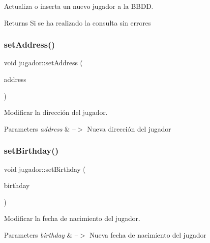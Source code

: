 Actualiza o inserta un nuevo jugador a la B\+B\+DD. 

\begin{DoxyReturn}{Returns}
Si se ha realizado la consulta sin errores 
\end{DoxyReturn}
\mbox{\label{classjugador_a1e4da4c657e46c0368f1db72ce102d93}} 
\subsubsection{\texorpdfstring{set\+Address()}{setAddress()}}
{\footnotesize\ttfamily void jugador\+::set\+Address (\begin{DoxyParamCaption}\item[{Q\+String}]{address }\end{DoxyParamCaption})}



Modificar la dirección del jugador. 


\begin{DoxyParams}{Parameters}
{\em address} & --$>$ Nueva dirección del jugador \\
\hline
\end{DoxyParams}
\mbox{\label{classjugador_ac974fe74ff98272b5652de36e5ba4680}} 
\subsubsection{\texorpdfstring{set\+Birthday()}{setBirthday()}}
{\footnotesize\ttfamily void jugador\+::set\+Birthday (\begin{DoxyParamCaption}\item[{Q\+Date}]{birthday }\end{DoxyParamCaption})}



Modificar la fecha de nacimiento del jugador. 


\begin{DoxyParams}{Parameters}
{\em birthday} & --$>$ Nueva fecha de nacimiento del jugador \\
\hline
\end{DoxyParams}
\mbox{\label{classjugador_ae00869eb01324db252abe1b2df0032bc}} 
